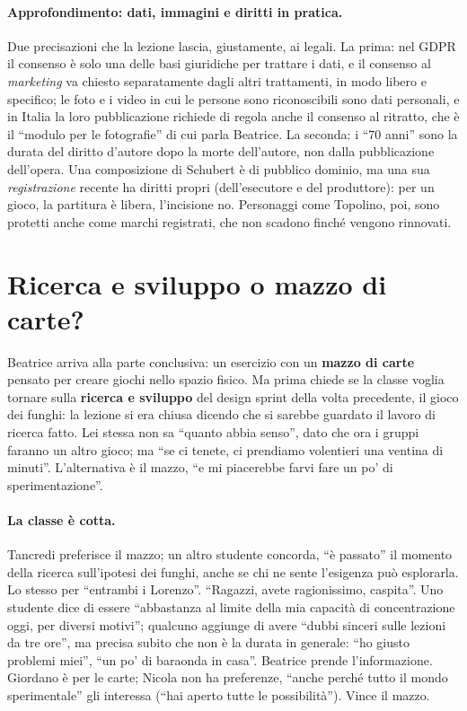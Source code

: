 \paragraph{Approfondimento: dati, immagini e diritti in pratica.} Due precisazioni
che la lezione lascia, giustamente, ai legali. La prima: nel GDPR il consenso è solo
una delle basi giuridiche per trattare i dati, e il consenso al \emph{marketing} va
chiesto separatamente dagli altri trattamenti, in modo libero e specifico; le foto e i
video in cui le persone sono riconoscibili sono dati personali, e in Italia la loro
pubblicazione richiede di regola anche il consenso al ritratto, che è il ``modulo per
le fotografie'' di cui parla Beatrice. La seconda: i ``70 anni'' sono la durata del
diritto d'autore dopo la morte dell'autore, non dalla pubblicazione dell'opera. Una
composizione di Schubert è di pubblico dominio, ma una sua \emph{registrazione}
recente ha diritti propri (dell'esecutore e del produttore): per un gioco, la
partitura è libera, l'incisione no. Personaggi come Topolino, poi, sono protetti anche
come marchi registrati, che non scadono finché vengono rinnovati.

\section{Ricerca e sviluppo o mazzo di carte?}
\label{a9:sec:scelta}

Beatrice arriva alla parte conclusiva: un esercizio con un \textbf{mazzo di carte}
pensato per creare giochi nello spazio fisico. Ma prima chiede se la classe voglia
tornare sulla \textbf{ricerca e sviluppo} del design sprint della volta precedente, il
gioco dei funghi: la lezione si era chiusa dicendo che si sarebbe guardato il lavoro di
ricerca fatto. Lei stessa non sa ``quanto abbia senso'', dato che ora i gruppi faranno
un altro gioco; ma ``se ci tenete, ci prendiamo volentieri una ventina di minuti''.
L'alternativa è il mazzo, ``e mi piacerebbe farvi fare un po' di sperimentazione''.

\paragraph{La classe è cotta.} Tancredi preferisce il mazzo; un altro studente
concorda, ``è passato'' il momento della ricerca sull'ipotesi dei funghi, anche se chi
ne sente l'esigenza può esplorarla. Lo stesso per ``entrambi i Lorenzo''. ``Ragazzi,
avete ragionissimo, caspita''. Uno studente dice di essere ``abbastanza al limite
della mia capacità di concentrazione oggi, per diversi motivi''; qualcuno aggiunge di
avere ``dubbi sinceri sulle lezioni da tre ore'', ma precisa subito che non è la durata
in generale: ``ho giusto problemi miei'', ``un po' di baraonda in casa''. Beatrice
prende l'informazione. Giordano è per le carte; Nicola non ha preferenze, ``anche
perché tutto il mondo sperimentale'' gli interessa (``hai aperto tutte le
possibilità''). Vince il mazzo.

